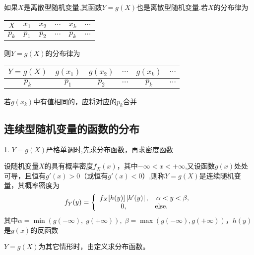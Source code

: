 如果$X$是离散型随机变量,其函数$Y = g(X)$也是离散型随机变量.若$X$的分布律为
\begin{table}[H]
    \begin{center}
        \begin{tabular}{|c|c|c|c|c|c|}
            \hline
            $X$   & $x_1$ & $x_2$ & $\cdots$ & $x_k$ & $\cdots$ \\
            \hline
            $p_k$ & $p_1$ & $p_2$ & $\cdots$ & $p_k$ & $\cdots$ \\
            \hline
        \end{tabular}
    \end{center}
\end{table}
则$Y=g(X)$的分布律为
\begin{table}[H]
    \begin{center}
        \begin{tabular}{|c|c|c|c|c|c|}
            \hline
            $Y=g(X)$ & $g(x_1)$ & $g(x_2)$ & $\cdots$ & $g(x_k)$ & $\cdots$ \\
            \hline
            $p_k$    & $p_1$    & $p_2$    & $\cdots$ & $p_k$    & $\cdots$ \\
            \hline
        \end{tabular}
    \end{center}
\end{table}
若$g(x_k)$中有值相同的，应将对应的$p_k$合并



\subsection{连续型随机变量的函数的分布}
1. $Y=g(X)$严格单调时,先求分布函数，再求密度函数
\begin{theorem}
    设随机变量$X$的具有概率密度${f_X}(x)$，其中$ - \infty  < x <  + \infty $,又设函数$g(x)$处处可导，且恒有$g'(x) > 0$（或恒有$g'(x) < 0$）,则称$Y = g(X)$是连续随机变量，其概率密度为
    $${f_Y}(y) = \left\{ {\begin{array}{*{20}{c}}
                    {{f_X}[h(y)]\left| {h'(y)} \right|,\quad \alpha  < y < \beta ,} \\
                    {0,\quad \quad \quad \quad {\rm{else}}.}
                \end{array}} \right.$$
    其中$\alpha  = \min (g( - \infty ),\;g( + \infty )),\;\beta  = \max (g( - \infty ),g( + \infty ))$，$h(y)$是$g(x)$的反函数
\end{theorem}

$Y=g(X)$为其它情形时，由定义求分布函数。

